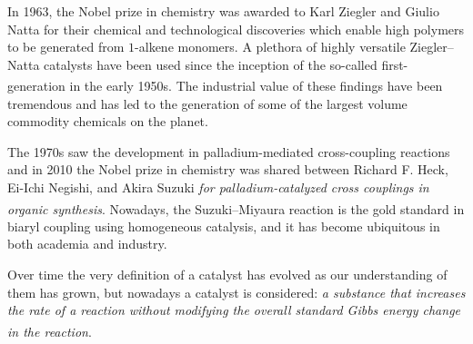 In 1963, the Nobel prize in chemistry was awarded to Karl Ziegler and Giulio Natta for their chemical and technological discoveries which enable high polymers to be generated from $1$-alkene monomers. A plethora of highly versatile Ziegler--Natta catalysts have been used since the inception of the so-called first-generation in the early 1950s.\textsuperscript{\cite{nowlin:2010}} The industrial value of these findings have been tremendous and has led to the generation of some of the largest volume commodity chemicals on the planet. 

The 1970s saw the development in palladium-mediated cross-coupling reactions and in 2010 the Nobel prize in chemistry was shared between Richard F. Heck, Ei-Ichi Negishi, and Akira Suzuki \textit{for palladium-catalyzed cross couplings in organic synthesis}.\textsuperscript{\cite{nobel:2010}} Nowadays, the Suzuki--Miyaura reaction is the gold standard in biaryl coupling using homogeneous catalysis, and it has become ubiquitous in both academia and industry.



Over time the very definition of a catalyst has evolved as our understanding of them has grown, but nowadays a catalyst is considered: \textit{a substance that increases the rate of a reaction without modifying the overall standard Gibbs energy change in the reaction}.\textsuperscript{\cite{iupac:2014}}


